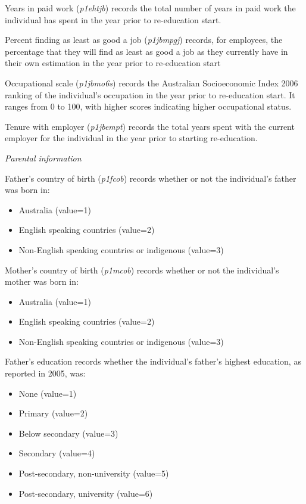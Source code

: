 \documentclass[12pt, a4paper]{article}
\begin{document}
Years in paid work (\textit{p1\textunderscore{}ehtjb})  records the total number of years in paid work the individual has spent in the year prior to re-education start.

Percent finding as least as good a job (\textit{p1\textunderscore{}jbmpgj})  records, for employees, the percentage that they will find as least as good a job as they currently have in their own estimation in the year prior to re-education start

Occupational scale (\textit{p1\textunderscore{}jbmo6s}) records the Australian Socioeconomic Index 2006 ranking of the individual’s occupation in the year prior to re-education start. It ranges from 0 to 100, with higher scores indicating higher occupational status. 

Tenure with employer (\textit{p1\textunderscore{}jbempt}) records the total years spent with the current employer for the individual in the year prior to starting re-education.

\emph{Parental information}

Father’s country of birth (\textit{p1\textunderscore{}fcob}) records whether or not the individual’s father was born in:
\begin{itemize}
  \item Australia (value=1) 
  \item English speaking countries (value=2)
  \item Non-English speaking countries or indigenous (value=3)
\end{itemize}  

Mother’s country of birth (\textit{p1\textunderscore{}mcob}) records whether or not the individual’s mother was born in:
\begin{itemize}
  \item Australia (value=1)
  \item English speaking countries (value=2)
  \item Non-English speaking countries or indigenous (value=3)
\end{itemize}  

Father’s education records whether the individual’s father’s highest education, as reported in 2005, was:
\begin{itemize}
  \item None (value=1)
  \item Primary (value=2)
  \item Below secondary (value=3)
  \item Secondary (value=4)
  \item Post-secondary, non-university (value=5)
  \item Post-secondary, university (value=6)
\end{itemize}  
\end{document}
